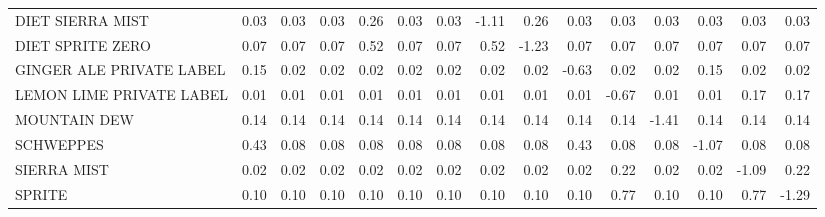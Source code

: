 \begin{tabular}{lrrrrrrrrrrrrrr}
DIET SIERRA MIST              &        0.03 &             0.03 &                           0.03 &                           0.26 &               0.03 &            0.03 &             -1.11 &              0.26 &                      0.03 &                      0.03 &          0.03 &       0.03 &         0.03 &    0.03 \\
DIET SPRITE ZERO              &        0.07 &             0.07 &                           0.07 &                           0.52 &               0.07 &            0.07 &              0.52 &             -1.23 &                      0.07 &                      0.07 &          0.07 &       0.07 &         0.07 &    0.07 \\
GINGER ALE PRIVATE LABEL      &        0.15 &             0.02 &                           0.02 &                           0.02 &               0.02 &            0.02 &              0.02 &              0.02 &                     -0.63 &                      0.02 &          0.02 &       0.15 &         0.02 &    0.02 \\
LEMON LIME PRIVATE LABEL      &        0.01 &             0.01 &                           0.01 &                           0.01 &               0.01 &            0.01 &              0.01 &              0.01 &                      0.01 &                     -0.67 &          0.01 &       0.01 &         0.17 &    0.17 \\
MOUNTAIN DEW                  &        0.14 &             0.14 &                           0.14 &                           0.14 &               0.14 &            0.14 &              0.14 &              0.14 &                      0.14 &                      0.14 &         -1.41 &       0.14 &         0.14 &    0.14 \\
SCHWEPPES                     &        0.43 &             0.08 &                           0.08 &                           0.08 &               0.08 &            0.08 &              0.08 &              0.08 &                      0.43 &                      0.08 &          0.08 &      -1.07 &         0.08 &    0.08 \\
SIERRA MIST                   &        0.02 &             0.02 &                           0.02 &                           0.02 &               0.02 &            0.02 &              0.02 &              0.02 &                      0.02 &                      0.22 &          0.02 &       0.02 &        -1.09 &    0.22 \\
SPRITE                        &        0.10 &             0.10 &                           0.10 &                           0.10 &               0.10 &            0.10 &              0.10 &              0.10 &                      0.10 &                      0.77 &          0.10 &       0.10 &         0.77 &   -1.29 \\
\bottomrule
\end{tabular}
